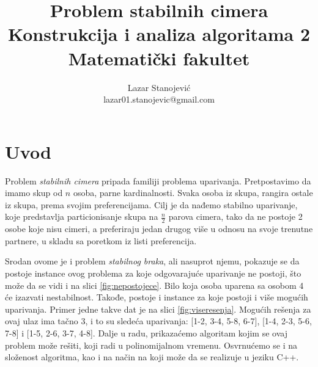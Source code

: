 \documentclass[a4paper]{article}
\begin{document}
\title{Problem stabilnih cimera\\ \small{Konstrukcija i analiza algoritama 2\\ Matematički fakultet}}

\author{Lazar Stanojević\\ lazar01.stanojevic@gmail.com}


\maketitle


\tableofcontents

\newpage

\section{Uvod}
\label{sec:uvod}
Problem \textit{stabilnih cimera} pripada familiji problema uparivanja. Pretpostavimo da imamo skup od $n$ osoba, parne kardinalnosti. Svaka osoba iz skupa, rangira ostale iz skupa, prema svojim preferencijama. Cilj je da nađemo stabilno uparivanje, koje predstavlja particionisanje skupa na $\frac{n}{2}$ parova cimera, tako da ne postoje 2 osobe koje nisu cimeri, a preferiraju jedan drugog više u odnosu na svoje trenutne partnere, u skladu sa poretkom iz listi preferencija.
\newline

Srodan ovome je i problem \textit{stabilnog braka}, ali nasuprot njemu, pokazuje se da postoje instance ovog problema za koje odgovarajuće uparivanje ne postoji, što može da se vidi i na slici \ref{fig:nepostojece}. Bilo koja osoba uparena sa osobom 4 će izazvati nestabilnost. 
Takođe, postoje i instance za koje postoji i više mogućih uparivanja. Primer jedne takve dat je na slici \ref{fig:viseresenja}.
Mogućih rešenja za ovaj ulaz ima tačno 3, i to su sledeća uparivanja: [1-2, 3-4, 5-8, 6-7], [1-4, 2-3, 5-6, 7-8] i [1-5, 2-6, 3-7, 4-8].
\newline
Dalje u radu, prikazaćemo algoritam kojim se ovaj problem može rešiti, koji radi u polinomijalnom vremenu. Osvrnućemo se i na složenost algoritma, kao i na način na koji može da se realizuje u jeziku C++.
\end{document}
